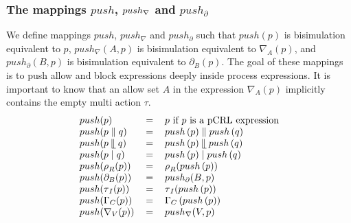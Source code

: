 \documentclass{article}
\providecommand{\leftmerge}{\mathbin{\mathrel{\llfloor}}}
\begin{document}
\subsubsection{The mappings $push$, $push_{\protect\nabla }$ and $%
push_{\partial }$}

We define mappings $push$, $push_{\nabla }$ and $push_{\partial }$ such that 
$push(p)$ is bisimulation equivalent to $p$, $push_{\nabla }(A,p)$ is
bisimulation equivalent to $\nabla _{A}(p)$, and $push_{\partial }(B,p)$ is
bisimulation equivalent to $\partial _{B}(p)$. The goal of these mappings is
to push allow and block expressions deeply inside process expressions. It is
important to know that an allow set $A$ in the expression $\nabla _{A}(p)$
implicitly contains the empty multi action $\tau $.%
\[
\begin{tabular}{lll}
$push(p)$ & $=$ & $p$ if $p$ is a pCRL expression \\ 
$push(p\parallel q)$ & $=$ & $push\left( p\right) \parallel push\left(
q\right) $ \\ 
$push(p\leftmerge q)$ & $=$ & $push\left( p\right) \leftmerge push\left(
q\right) $ \\ 
$push(p\mid q)$ & $=$ & $push\left( p\right) \mid push\left( q\right) $ \\ 
$push(\rho _{R}(p))$ & $=$ & $\rho _{R}(push\left( p\right) )$ \\ 
$push(\partial _{B}(p))$ & $=$ & $push_{\partial }(B,p)$ \\ 
$push(\tau _{I}(p))$ & $=$ & $\tau _{I}(push\left( p\right) )$ \\ 
$push(\Gamma _{C}(p))$ & $=$ & $\Gamma _{C}\left( push\left( p\right)
\right) $ \\ 
$push(\nabla _{V}(p))$ & $=$ & $push_{\nabla }(V,p)$%
\end{tabular}%
\]%
\end{document}
